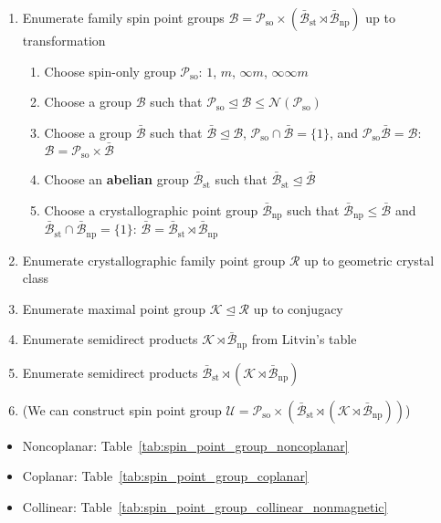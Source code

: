 \begin{enumerate}
  \item Enumerate family spin point groups $\mathcal{B} = \mathcal{P}_{\mathrm{so}} \times ( \bar{\mathcal{B}}_{\mathrm{st}} \rtimes \bar{\mathcal{B}}_{\mathrm{np}} )$ up to transformation
    \begin{enumerate}
      \item Choose spin-only group $\mathcal{P}_{\mathrm{so}}$: $1$, $m$, $\infty m$, $\infty \infty m$
      \item Choose a group $\mathcal{B}$ such that $\mathcal{P}_{\mathrm{so}} \trianglelefteq \mathcal{B} \leq \mathcal{N}(\mathcal{P}_{\mathrm{so}})$
      \item Choose a group $\bar{\mathcal{B}}$ such that $\bar{\mathcal{B}} \trianglelefteq \mathcal{B}$, $\mathcal{P}_{\mathrm{so}} \cap \bar{\mathcal{B}} = \{ 1 \}$, and $\mathcal{P}_{\mathrm{so}} \bar{\mathcal{B}} = \mathcal{B}$: $\mathcal{B} = \mathcal{P}_{\mathrm{so}} \times \bar{\mathcal{B}}$
      \item Choose an \textbf{abelian} group $\bar{\mathcal{B}}_{\mathrm{st}}$ such that $\bar{\mathcal{B}}_{\mathrm{st}} \trianglelefteq \bar{\mathcal{B}}$
      \item Choose a crystallographic point group $\bar{\mathcal{B}}_{\mathrm{np}}$ such that $\bar{\mathcal{B}}_{\mathrm{np}} \leq \bar{\mathcal{B}}$ and $\bar{\mathcal{B}}_{\mathrm{st}} \cap \bar{\mathcal{B}}_{\mathrm{np}} = \{ 1 \}$: $\bar{\mathcal{B}} = \bar{\mathcal{B}}_{\mathrm{st}} \rtimes \bar{\mathcal{B}}_{\mathrm{np}}$
    \end{enumerate}
  \item Enumerate crystallographic family point group $\mathcal{R}$ up to geometric crystal class
  \item Enumerate maximal point group $\mathcal{K} \trianglelefteq \mathcal{R}$ up to conjugacy
  \item Enumerate semidirect products $\mathcal{K} \rtimes \bar{\mathcal{B}}_{\mathrm{np}}$ from Litvin's table
  \item Enumerate semidirect products $\bar{\mathcal{B}}_{\mathrm{st}} \rtimes (\mathcal{K} \rtimes \bar{\mathcal{B}}_{\mathrm{np}})$
  \item (We can construct spin point group $\mathcal{U} = \mathcal{P}_{\mathrm{so}} \times \left( \bar{\mathcal{B}}_{\mathrm{st}} \rtimes (\mathcal{K} \rtimes \bar{\mathcal{B}}_{\mathrm{np}}) \right)$)
\end{enumerate}


\begin{itemize}
  \item Noncoplanar: Table~\ref{tab:spin_point_group_noncoplanar}
  \item Coplanar: Table~\ref{tab:spin_point_group_coplanar}
  \item Collinear: Table~\ref{tab:spin_point_group_collinear_nonmagnetic}
\end{itemize}

